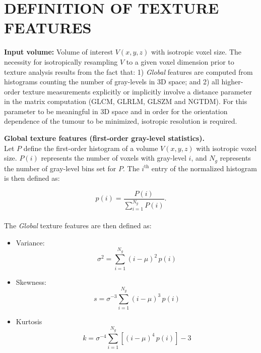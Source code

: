 \documentclass{article}
\begin{document}
\section*{DEFINITION OF TEXTURE FEATURES}
\bigskip

\noindent \textbf{Input volume:} Volume of interest $V(x,y,z)$ with isotropic voxel size. The necessity for isotropically resampling $V$ to a given voxel dimension prior to texture analysis results from the fact that: 1) \textit{Global} features are computed from histograms counting the number of gray-levels in 3D space; and 2) all higher-order texture measurements explicitly or implicitly involve a distance parameter in the matrix computation (GLCM, GLRLM, GLSZM and NGTDM). For this parameter to be meaningful in 3D space and in order for the orientation dependence of the tumour to be minimized, isotropic resolution is required.
\bigskip \bigskip

\noindent \textbf{Global texture features (first-order gray-level statistics).} \\
Let $P$ define the first-order histogram of a volume $V(x,y,z)$ with isotropic voxel size. $P(i)$ represents the number of voxels with gray-level $i$, and $N_g$ represents the number of gray-level bins set for $P$. The $i^{\mathrm{th}}$ entry of the normalized histogram is then defined as:

\[p(i) = \frac{P(i)}{\sum_{i=1}^{N_g} P(i)}.\] \\

\noindent The \textit{Global} texture features are then defined as:

\begin{itemize}
	\item Variance:
		  \[\sigma^2 = \sum_{i=1}^{N_g} (i-\mu)^2\,p(i)\] 
	\item Skewness:
		  \[s = \sigma^{-3} \sum_{i=1}^{N_g} (i-\mu)^3\,p(i)\]
	\item Kurtosis
		  \[k = \sigma^{-4} \sum_{i=1}^{N_g} \left[(i-\mu)^4\,p(i)\right]-3\]
	\\
\end{itemize}
\end{document}
